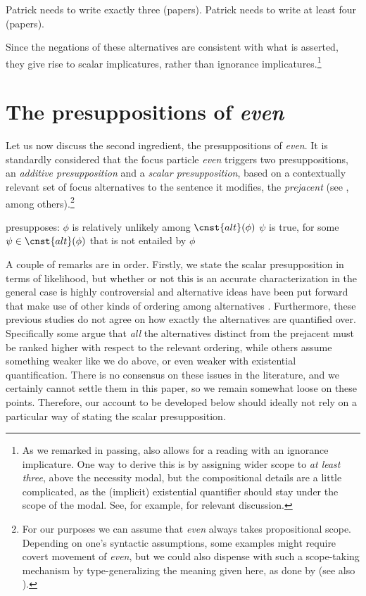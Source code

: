 \documentclass[output=paper]{langscibook}
\begin{document}
\ea
  \ea Patrick needs to write exactly three (papers).
  \ex Patrick needs to write at least four (papers).\z
\z

\noindent Since the negations of these alternatives are consistent with what is asserted, they give rise to scalar implicatures, rather than ignorance implicatures.\footnote{As we remarked in passing,  also allows for a reading with an ignorance implicature. One way to derive this is by assigning wider scope to \textit{at least three}, above the necessity modal, but the compositional details are a little complicated, as the (implicit) existential quantifier should stay under the scope of the modal. See, for example, \citet{krifka, hackl, beck} for relevant discussion.}


\section{The presuppositions of \textit{even}}
\label{don-sud:sec:even}

Let us now discuss the second ingredient, the presuppositions of \textit{even}. It is standardly considered that the focus particle \textit{even} triggers two presuppositions, an \textit{additive presupposition} and a \textit{scalar presupposition}, based on a contextually relevant set of focus alternatives to the sentence it modifies, the \textit{prejacent} (see \citealt{karttunenpeters, rooth, kay, wilkinson, crnic}, among others).\footnote{For our purposes we can assume that \textit{even} always takes propositional scope. Depending on one's syntactic assumptions, some examples might require covert movement of \textit{even}, but we could also dispense with such a scope-taking mechanism by type-generalizing the meaning given here, as done by \citet{rooth} (see also \citealt{panizzasudo}).\label{don-sud:scope}}

    \ea\label{don-sud:evensem}  presupposes:
        \ea $\phi$ is relatively unlikely among $\cnst{alt}(\phi)$ \hfill {}
        \ex $\psi$ is true, for some $\psi\in \cnst{alt}(\phi)$ that is not entailed by $\phi$ \hfill {}
        \z
    \z

\noindent A couple of remarks are in order. Firstly, we state the scalar presupposition in terms of likelihood, but whether or not this is an accurate characterization in the general case is highly controversial and alternative ideas have been put forward that make use of other kinds of ordering among alternatives \citep{rooth, kay, herburger, greenberg}. Furthermore, these previous studies do not agree on how exactly the alternatives are quantified over. Specifically some argue that \textit{all} the alternatives distinct from the prejacent must be ranked higher with respect to the relevant ordering, while others assume something weaker like we do above, or even weaker with existential quantification. There is no consensus on these issues in the literature, and we certainly cannot settle them in this paper, so we remain somewhat loose on these points. Therefore, our account to be developed below should ideally not rely on a particular way of stating the scalar presupposition.
\end{document}
